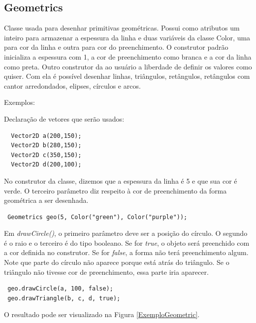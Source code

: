 \subsection{Geometrics}
%
%
Classe usada para desenhar primitivas geométricas. Possui como atributos um inteiro para armazenar a espessura da linha e duas variáveis da classe Color, uma para cor da linha e outra para cor do preenchimento. O construtor padrão inicializa a espessura com 1, a cor de preenchimento como branca e a cor da linha como preta. Outro construtor da ao usuário a liberdade de definir os valores como quiser. Com ela é possível desenhar linhas, triângulos, retângulos, retângulos com cantor arredondados, elipses, círculos e arcos. 
\par 
Exemplos: 
\par
Declaração de vetores que serão usados:
%
\begin{lstlisting}
  Vector2D a(200,150);
  Vector2D b(280,150);
  Vector2D c(350,150);
  Vector2D d(200,100);
\end{lstlisting}
%
%
\par 
No construtor da classe, dizemos que a espessura da linha é 5 e que sua cor é verde. O terceiro parâmetro diz respeito à cor de preenchimento da forma geométrica a ser desenhada. 
%
\begin{lstlisting}
 Geometrics geo(5, Color("green"), Color("purple"));
\end{lstlisting}
%
Em \textit{drawCircle()}, o primeiro parâmetro deve ser a posição do círculo. O segundo é o raio e o terceiro é do tipo booleano. Se for \textit{true}, o objeto será preenchido com a cor definida no construtor. Se for \textit{false}, a forma não terá preenchimento algum. Note que parte do círculo não aparece porque está atrás do triângulo. Se o triângulo não tivesse cor de preenchimento, essa parte iria aparecer. 
%
\begin{lstlisting}
 geo.drawCircle(a, 100, false);
 geo.drawTriangle(b, c, d, true);
\end{lstlisting}
% 
%
O resultado pode ser visualizado na Figura \ref{ExemploGeometric}.
%
